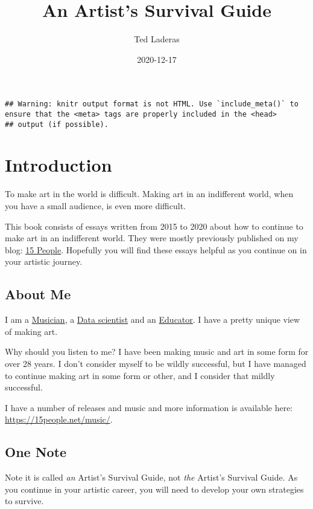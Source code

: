 \documentclass[
]{book}
\title{An Artist's Survival Guide}
\author{Ted Laderas}
\date{2020-12-17}
\begin{document}
\maketitle

{
\setcounter{tocdepth}{1}
\tableofcontents
}
\begin{verbatim}
## Warning: knitr output format is not HTML. Use `include_meta()` to ensure that the <meta> tags are properly included in the <head>
## output (if possible).
\end{verbatim}

\hypertarget{introduction}{%
\chapter{Introduction}\label{introduction}}

To make art in the world is difficult. Making art in an indifferent world, when you have a small audience, is even more difficult.

This book consists of essays written from 2015 to 2020 about how to continue to make art in an indifferent world. They were mostly previously published on my blog: \href{https://15people.net}{15 People}. Hopefully you will find these essays helpful as you continue on in your artistic journey.

\hypertarget{about-me}{%
\section{About Me}\label{about-me}}

I am a \href{https://15people.net}{Musician}, a \href{https://laderast.github.io}{Data scientist} and an \href{https://laderast.github.io/cv}{Educator}. I have a pretty unique view of making art.

Why should you listen to me? I have been making music and art in some form for over 28 years. I don't consider myself to be wildly successful, but I have managed to continue making art in some form or other, and I consider that mildly successful.

I have a number of releases and music and more information is available here: \url{https://15people.net/music/}.

\hypertarget{one-note}{%
\section{One Note}\label{one-note}}

Note it is called \emph{an} Artist's Survival Guide, not \emph{the} Artist's Survival Guide. As you continue in your artistic career, you will need to develop your own strategies to survive.
\end{document}
